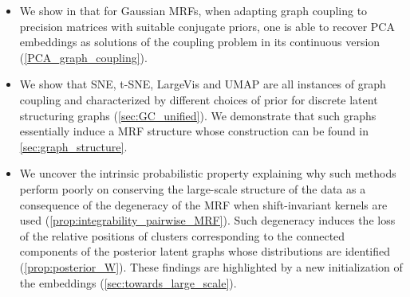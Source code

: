 \begin{itemize}
    \item We show in  that for Gaussian MRFs, when adapting graph coupling to precision matrices with suitable conjugate priors, one is able to recover PCA embeddings as solutions of the coupling problem in its continuous version (\cref{PCA_graph_coupling}).
    \item We show that SNE, t-SNE, LargeVis and UMAP are all instances of graph coupling and characterized by different choices of prior for discrete latent structuring graphs (\cref{sec:GC_unified}). We demonstrate that such graphs essentially induce a MRF structure whose construction can be found in \cref{sec:graph_structure}.
    \item We uncover the intrinsic probabilistic property explaining why such methods perform poorly on conserving the large-scale structure of the data as a consequence of the degeneracy of the MRF when shift-invariant kernels are used (\cref{prop:integrability_pairwise_MRF}). Such degeneracy induces the loss of the relative positions of clusters corresponding to the connected components of the posterior latent graphs whose distributions are identified (\cref{prop:posterior_W}). These findings are highlighted by a new initialization of the embeddings (\cref{sec:towards_large_scale}).
\end{itemize}
